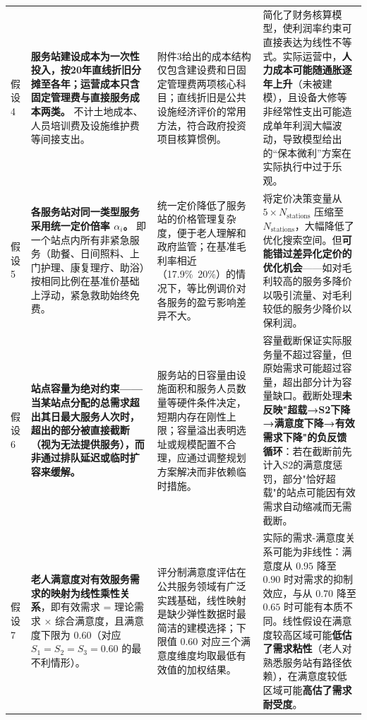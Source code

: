 \documentclass[UTF8]{ctexart}
\begin{document}
{\begin{longtable}{|>{\centering\arraybackslash}p{1.5cm}|>{\centering\arraybackslash}p{4cm}|>{\centering\arraybackslash}p{4cm}|>{\centering\arraybackslash}p{3cm}|}
假设4 & \textbf{服务站建设成本为一次性投入，按20年直线折旧分摊至各年；运营成本只含固定管理费与直接服务成本两类。} 不计土地成本、人员培训费及设施维护费等间接支出。 & 附件3给出的成本结构仅包含建设费和日固定管理费两项核心科目；直线折旧是公共设施经济评价的常用方法，符合政府投资项目核算惯例。 & 简化了财务核算模型，使利润率约束可直接表达为线性不等式。实际运营中，\textbf{人力成本可能随通胀逐年上升}（未被建模），且设备大修等非经常性支出可能造成单年利润大幅波动，导致模型给出的“保本微利”方案在实际执行中过于乐观。 \\

假设5 & \textbf{各服务站对同一类型服务采用统一定价倍率 $\alpha_i$。} 即一个站点内所有非紧急服务（助餐、日间照料、上门护理、康复理疗、助浴）按相同比例在基准价基础上浮动，紧急救助始终免费。 & 统一定价降低了服务站的价格管理复杂度，便于老人理解和政府监管；在基准毛利率相近（17.9\%~20\%）的情况下，等比例调价对各服务的盈亏影响差异不大。 & 将定价决策变量从 $5\times N_{\text{stations}}$ 压缩至 $N_{\text{stations}}$，大幅降低了优化搜索空间。但\textbf{可能错过差异化定价的优化机会}——如对毛利较高的服务多降价以吸引流量、对毛利较低的服务少降价以保利润。 \\

假设6 & \textbf{站点容量为绝对约束——当某站点分配的总需求超出其日最大服务人次时，超出的部分被直接截断（视为无法提供服务），而非通过排队延迟或临时扩容来缓解。} & 服务站的日容量由设施面积和服务人员数量等硬件条件决定，短期内存在刚性上限；容量溢出表明选址或规模配置不合理，应通过调整规划方案解决而非依赖临时措施。 & 容量截断保证实际服务量不超过容量，但原始需求可能超过容量，超出部分计为容量缺口。截断处理\textbf{未反映"超载→S2下降→满意度下降→有效需求下降"的负反馈循环}：若在截断前先计入S2的满意度惩罚，部分"恰好超载"的站点可能因有效需求自动缩减而无需截断。 \\

假设7 & \textbf{老人满意度对有效服务需求的映射为线性乘性关系}，即有效需求 = 理论需求 × 综合满意度，且满意度下限为 $0.60$（对应 $S_1=S_2=S_3=0.60$ 的最不利情形）。 & 评分制满意度评估在公共服务领域有广泛实践基础，线性映射是缺少弹性数据时最简洁的建模选择；下限值 $0.60$ 对应三个满意度维度均取最低有效值的加权结果。 & 实际的需求-满意度关系可能为非线性：满意度从 $0.95$ 降至 $0.90$ 时对需求的抑制效应，与从 $0.70$ 降至 $0.65$ 时可能有本质不同。线性假设在满意度较高区域可能\textbf{低估了需求粘性}（老人对熟悉服务站有路径依赖），在满意度较低区域可能\textbf{高估了需求耐受度}。 \\

\end{longtable}
}
\end{document}
